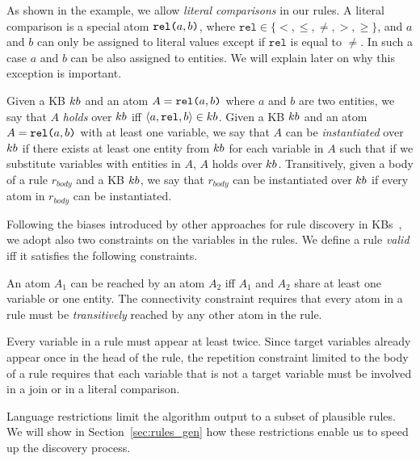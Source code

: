 As shown in the example, we allow \emph{literal comparisons} in our rules. A literal comparison is a special atom $\texttt{rel(}a,b\texttt{)}$, where $\texttt{rel} \in \{<,\leq,\neq,>,\geq\}$, and $a$ and $b$ can only be assigned to literal values except if $\texttt{rel}$ is equal to $\neq$. In such a case $a$ and $b$ can be also assigned to entities. We will explain later on why this exception is important.

Given a KB ${\sc kb}$ and an atom $A=\texttt{rel(}a,b\texttt{)}$ where $a$ and $b$ are two entities, we say that $A$ \emph{holds} over ${\sc kb}$ iff $\langle a,\texttt{rel},b\rangle \in {\sc kb}$.
Given a KB ${\sc kb}$ and an atom $A=\texttt{rel(}a,b\texttt{)}$ with at least one variable, we say that $A$ can be \emph{instantiated} over ${\sc kb}$ if there exists at least one entity from ${\sc kb}$ for each variable in $A$ such that if we substitute variables with entities in $A$, $A$ holds over ${\sc kb}$. Transitively, given a body of a rule $r_{body}$ and a KB ${\sc kb}$, we say that $r_{body}$ can be instantiated over ${\sc kb}$ if every atom in $r_{body}$ can be instantiated. 

Following the biases introduced by other approaches for rule discovery in KBs~\cite{galarraga2015fast,Chen:2016}, we adopt also two constraints on the variables in the rules.
We define a rule \emph{valid} iff it satisfies the following constraints.

\vspace{1ex}
 An atom $A_1$ can be reached by an atom $A_2$ iff $A_1$ and $A_2$ share at least one variable or one entity. The connectivity constraint requires that every atom in a rule must be \emph{transitively} reached by any other atom in the rule.

\vspace{1ex}
 Every variable in a rule must appear at least twice. Since target variables already appear once in the head of the rule, the repetition constraint limited to the body of a rule requires that each variable that is not a target variable must be involved in a join or in a literal comparison.

Language restrictions limit the algorithm output 
to a subset of plausible rules. We will show in Section~\ref{sec:rules_gen} how these restrictions enable us to speed up the discovery process. %

